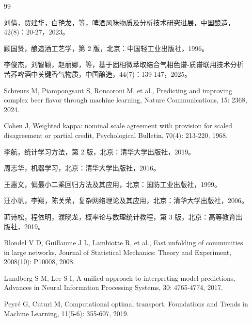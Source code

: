 \documentclass[UTF8,a4paper,zihao=-4]{ctexart}
\numberwithin{figure}{section}
\numberwithin{table}{section}
\numberwithin{equation}{section}
\begin{document}
\begin{thebibliography}{99}
\raggedright
{}

刘倩，贾建华，白艳龙，等，啤酒风味物质及分析技术研究进展，中国酿造，42(8)：20-27，2023。

顾国贤，酿造酒工艺学，第 2 版，北京：中国轻工业出版社，1996。

李俊杰，刘智颖，赵丽娜，等，基于固相微萃取结合气相色谱-质谱联用技术分析苦荞啤酒中关键香气物质，中国酿造，44(7)：139-147，2025。

Schreurs M, Piampongsant S, Roncoroni M, et al., Predicting and improving complex beer flavor through machine learning, Nature Communications, 15: 2368, 2024.

Cohen J, Weighted kappa: nominal scale agreement with provision for scaled disagreement or partial credit, Psychological Bulletin, 70(4): 213-220, 1968.

李航，统计学习方法，第 2 版，北京：清华大学出版社，2019。

周志华，机器学习，北京：清华大学出版社，2016。

王惠文，偏最小二乘回归方法及其应用，北京：国防工业出版社，1999。

汪小帆，李翔，陈关荣，复杂网络理论及其应用，北京：清华大学出版社，2006。

茆诗松，程依明，濮晓龙，概率论与数理统计教程，第 3 版，北京：高等教育出版社，2019。

Blondel V D, Guillaume J L, Lambiotte R, et al., Fast unfolding of communities in large networks, Journal of Statistical Mechanics: Theory and Experiment, 2008(10): P10008, 2008.

Lundberg S M, Lee S I, A unified approach to interpreting model predictions, Advances in Neural Information Processing Systems, 30: 4765-4774, 2017.

Peyr\'e G, Cuturi M, Computational optimal transport, Foundations and Trends in Machine Learning, 11(5-6): 355-607, 2019.

\end{thebibliography}
\end{document}
